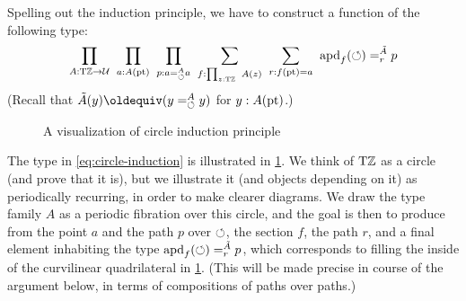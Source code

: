 \documentclass[a4paper,12pt]{amsart}
\begin{document}
Spelling out the induction principle, we have to construct a
function of the following type:
\begin{equation}
  \label{eq:circle-induction}
  \thinmuskip=10mu              %
  \prod_{A: \TorZ\to\UU}
  \prod_{a: A(\pt)}
  \prod_{p: a=^A_{\Zloop} a}
  \sum_{f: \prod_{z:\TorZ} A(z)}
  \sum_{r: f(\pt)= a}
  \apd{f}(\Zloop) =^{\tilde A}_r p
\end{equation}
(Recall that $\tilde A(y) \jdeq (y =^A_\Zloop y)$ for $y : A({\mathord{\mathrm{pt}}})$.)

\begin{figure}
  \centering
  \caption{A visualization of circle induction principle}
  \label{fig:circle-induction}
\end{figure}

The type in \cref{eq:circle-induction} is illustrated in \cref{fig:circle-induction}.
We think of ${\mathrm{T}\mathbb{Z}}$ as a circle (and prove that it is),
but we illustrate it (and objects depending on it) as periodically recurring,
in order to make clearer diagrams.
We draw the type family $A$ as a periodic fibration over this circle,
and the goal is then to produce from the point $a$ and the path $p$ over ${\circlearrowleft}$,
the section $f$, the path $r$, and a final element inhabiting
the type $\mathop{{\mathrm{apd}}_{f}}({\circlearrowleft}) =^{\tilde A}_r p$,
which corresponds to filling the inside of the curvilinear quadrilateral in \cref{fig:circle-induction}.
(This will be made precise in course of the argument below,
in terms of compositions of paths over paths.)
\end{document}
